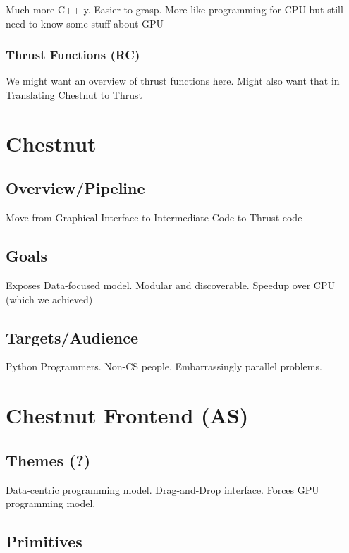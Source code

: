 \documentclass{article}
\renewcommand{\|}{\origbar} %
\begin{document}
Much more C++-y. Easier to grasp. More like programming for CPU but still need to know some stuff about GPU

\subsubsection{Thrust Functions (RC)}

We might want an overview of thrust functions here. Might also want that in Translating Chestnut to Thrust

\section{Chestnut}

\subsection{Overview/Pipeline}

Move from Graphical Interface to Intermediate Code to Thrust code

\subsection{Goals}

Exposes Data-focused model. Modular and discoverable. Speedup over CPU (which we achieved)

\subsection{Targets/Audience}

Python Programmers. Non-CS people. Embarrassingly parallel problems.

\section{Chestnut Frontend (AS)}

\subsection{Themes (?)}

Data-centric programming model. Drag-and-Drop interface. Forces GPU programming model.

\subsection{Primitives}
\end{document}
